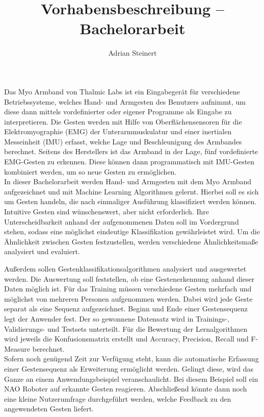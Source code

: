 \documentclass[]{scrartcl}
\title{Vorhabensbeschreibung -- Bachelorarbeit}
\author{Adrian Steinert}
\begin{document}
\maketitle

Das Myo Armband von Thalmic Labs ist ein Eingabegerät für verschiedene Betriebssysteme, welches Hand- und Armgesten des Benutzers aufnimmt, um diese dann mittels vordefinierter oder eigener Programme als Eingabe zu interpretieren. Die Gesten werden mit Hilfe von Oberflächensensoren für die Elektromyographie (EMG) der Unterarmmuskulatur und einer inertialen Messeinheit (IMU) erfasst, welche Lage und Beschleunigung des Armbandes berechnet. Seitens des Herstellers ist das Armband in der Lage, fünf vordefinierte EMG-Gesten zu erkennen. Diese können dann programmatisch mit IMU-Gesten kombiniert werden, um so neue Gesten zu ermöglichen.\\


In dieser Bachelorarbeit werden Hand- und Armgesten mit dem Myo Armband aufgezeichnet und mit Machine Learning Algorithmen gelernt. Hierbei soll es sich um Gesten handeln, die nach einmaliger Ausführung klassifiziert werden können. Intuitive Gesten sind wünschenswert, aber nicht erforderlich. Ihre Unterscheidbarkeit anhand der aufgenommenen Daten soll im Vordergrund stehen, sodass eine möglichst eindeutige Klassifikation gewährleistet wird. Um die Ähnlichkeit zwischen Gesten festzustellen, werden verschiedene Ähnlichkeitsmaße analysiert und evaluiert. 

Außerdem sollen Gestenklassifikationsalgorithmen analysiert und ausgewertet werden. Die Auswertung soll feststellen, ob eine Gestenerkennung anhand dieser Daten möglich ist. Für das Training müssen verschiedene Gesten mehrfach und möglichst von mehreren Personen aufgenommen werden. Dabei wird jede Geste separat als eine Sequenz aufgezeichnet. Beginn und Ende einer Gestensequenz legt der Anwender fest. Der so gewonnene Datensatz wird in Trainings-, Validierungs- und Testsets unterteilt. Für die Bewertung der Lernalgorithmen wird jeweils die Konfusionsmatrix erstellt und Accuracy, Precision, Recall und F-Measure berechnet.\\


Sofern noch genügend Zeit zur Verfügung steht, kann die automatische Erfassung einer Gestensequenz als Erweiterung ermöglicht werden. Gelingt diese, wird das Ganze an einem Anwendungsbeispiel veranschaulicht. Bei diesem Beispiel soll ein NAO Roboter auf erkannte Gesten reagieren. Abschließend könnte dann noch eine kleine Nutzerumfrage durchgeführt werden, welche Feedback zu den angewendeten Gesten liefert. 


\end{document}
